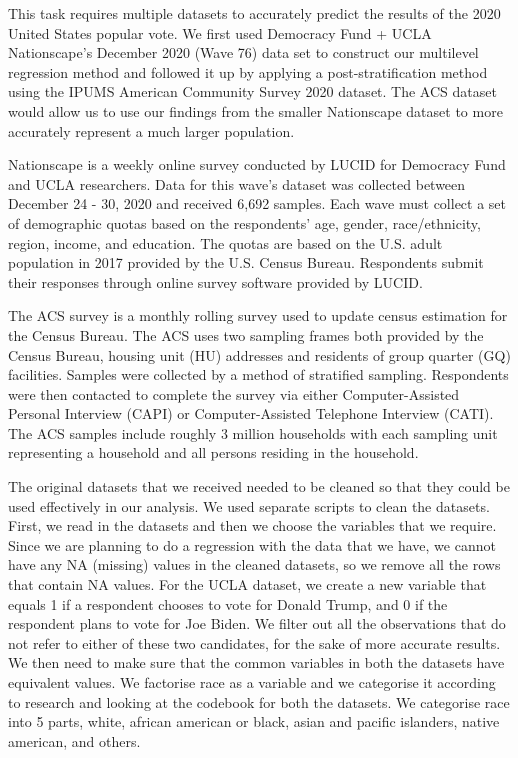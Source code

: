 \documentclass[
]{article}
\begin{document}
This task requires multiple datasets to accurately predict the results of the 2020 United States popular vote. We first used Democracy Fund + UCLA Nationscape's December 2020 (Wave 76) data set to construct our multilevel regression method and followed it up by applying a post-stratification method using the IPUMS American Community Survey 2020 dataset. The ACS dataset would allow us to use our findings from the smaller Nationscape dataset to more accurately represent a much larger population.

Nationscape is a weekly online survey conducted by LUCID for Democracy Fund and UCLA researchers. Data for this wave's dataset was collected between December 24 - 30, 2020 and received 6,692 samples. Each wave must collect a set of demographic quotas based on the respondents' age, gender, race/ethnicity, region, income, and education. The quotas are based on the U.S. adult population in 2017 provided by the U.S. Census Bureau. Respondents submit their responses through online survey software provided by LUCID.

The ACS survey is a monthly rolling survey used to update census estimation for the Census Bureau. The ACS uses two sampling frames both provided by the Census Bureau, housing unit (HU) addresses and residents of group quarter (GQ) facilities. Samples were collected by a method of stratified sampling. Respondents were then contacted to complete the survey via either Computer-Assisted Personal Interview (CAPI) or Computer-Assisted Telephone Interview (CATI). The ACS samples include roughly 3 million households with each sampling unit representing a household and all persons residing in the household.

The original datasets that we received needed to be cleaned so that they could be used effectively in our analysis. We used separate scripts to clean the datasets. First, we read in the datasets and then we choose the variables that we require. Since we are planning to do a regression with the data that we have, we cannot have any NA (missing) values in the cleaned datasets, so we remove all the rows that contain NA values. For the UCLA dataset, we create a new variable that equals 1 if a respondent chooses to vote for Donald Trump, and 0 if the respondent plans to vote for Joe Biden. We filter out all the observations that do not refer to either of these two candidates, for the sake of more accurate results. We then need to make sure that the common variables in both the datasets have equivalent values. We factorise race as a variable and we categorise it according to research and looking at the codebook for both the datasets. We categorise race into 5 parts, white, african american or black, asian and pacific islanders, native american, and others.
\end{document}
